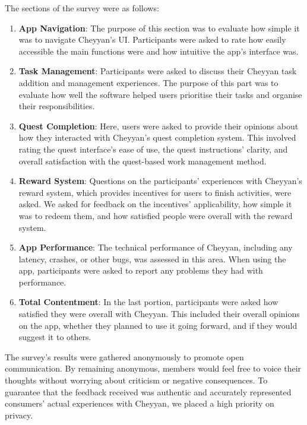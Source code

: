 \documentclass{l4proj}
\begin{document}
The sections of the survey were as follows:

\begin{enumerate}
    \item \textbf{App Navigation}: The purpose of this section was to evaluate how simple it was to navigate Cheyyan's UI. Participants were asked to rate how easily accessible the main functions were and how intuitive the app's interface was.
    
    \item \textbf{Task Management}: Participants were asked to discuss their Cheyyan task addition and management experiences. The purpose of this part was to evaluate how well the software helped users prioritise their tasks and organise their responsibilities.
    
    \item \textbf{Quest Completion}: Here, users were asked to provide their opinions about how they interacted with Cheyyan's quest completion system. This involved rating the quest interface's ease of use, the quest instructions' clarity, and overall satisfaction with the quest-based work management method.
    
    \item \textbf{Reward System}: Questions on the participants' experiences with Cheyyan's reward system, which provides incentives for users to finish activities, were asked. We asked for feedback on the incentives' applicability, how simple it was to redeem them, and how satisfied people were overall with the reward system.
    
    \item \textbf{App Performance}: The technical performance of Cheyyan, including any latency, crashes, or other bugs, was assessed in this area. When using the app, participants were asked to report any problems they had with performance.
    
    \item \textbf{Total Contentment}: In the last portion, participants were asked how satisfied they were overall with Cheyyan. This included their overall opinions on the app, whether they planned to use it going forward, and if they would suggest it to others.
\end{enumerate}

The survey's results were gathered anonymously to promote open communication. By remaining anonymous, members would feel free to voice their thoughts without worrying about criticism or negative consequences. To guarantee that the feedback received was authentic and accurately represented consumers' actual experiences with Cheyyan, we placed a high priority on privacy.
\end{document}
